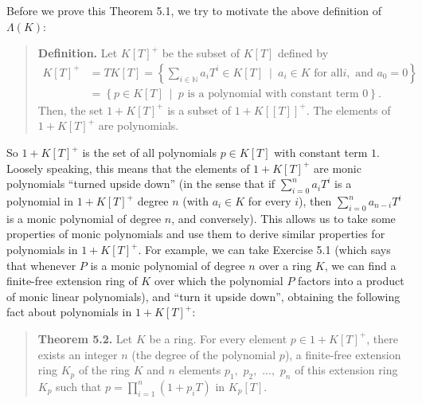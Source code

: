 \documentclass[numbers=enddot,12pt,final,onecolumn,notitlepage]{scrartcl}%
\begin{document}
Before we prove this Theorem 5.1, we try to motivate the above definition of
$\Lambda\left(  K\right)  $:

\begin{quote}
\textbf{Definition.} Let $K\left[  T\right]  ^{+}$ be the subset of $K\left[
T\right]  $ defined by%
\begin{align*}
K\left[  T\right]  ^{+}  &  =TK\left[  T\right]  =\left\{  \sum_{i\in
\mathbb{N}}a_{i}T^{i}\in K\left[  T\right]  \ \mid\ a_{i}\in K\text{ for all
}i,\text{ and }a_{0}=0\right\} \\
&  =\left\{  p\in K\left[  T\right]  \ \mid\ p\text{ is a polynomial with
constant term }0\right\}  .
\end{align*}
Then, the set $1+K\left[  T\right]  ^{+}$ is a subset of $1+K\left[  \left[
T\right]  \right]  ^{+}.$ The elements of $1+K\left[  T\right]  ^{+}$ are polynomials.
\end{quote}

So $1+K\left[  T\right]  ^{+}$ is the set of all polynomials $p\in K\left[
T\right]  $ with constant term $1$. Loosely speaking, this means that the
elements of $1+K\left[  T\right]  ^{+}$ are monic polynomials ``turned upside
down'' (in the sense that if $\sum\limits_{i=0}^{n}a_{i}T^{i}$ is a polynomial
in $1+K\left[  T\right]  ^{+}$ degree $n$ (with $a_{i}\in K$ for every $i$),
then $\sum\limits_{i=0}^{n}a_{n-i}T^{i}$ is a monic polynomial of degree $n$,
and conversely). This allows us to take some properties of monic polynomials
and use them to derive similar properties for polynomials in $1+K\left[
T\right]  ^{+}$. For example, we can take Exercise 5.1 (which says that
whenever $P$ is a monic polynomial of degree $n$ over a ring $K$, we can find
a finite-free extension ring of $K$ over which the polynomial $P$ factors into
a product of monic linear polynomials), and ``turn it upside down'', obtaining
the following fact about polynomials in $1+K\left[  T\right]  ^{+}$:

\begin{quote}
\textbf{Theorem 5.2.} Let $K$ be a ring. For every element $p\in1+K\left[
T\right]  ^{+}$, there exists an integer $n$ (the degree of the polynomial
$p$), a finite-free extension ring $K_{p}$ of the ring $K$ and $n$ elements
$p_{1},$ $p_{2},$ $...,$ $p_{n}$ of this extension ring $K_{p}$ such that
$p=\prod\limits_{i=1}^{n}\left(  1+p_{i}T\right)  $ in $K_{p}\left[  T\right]
$.
\end{quote}
\end{document}
